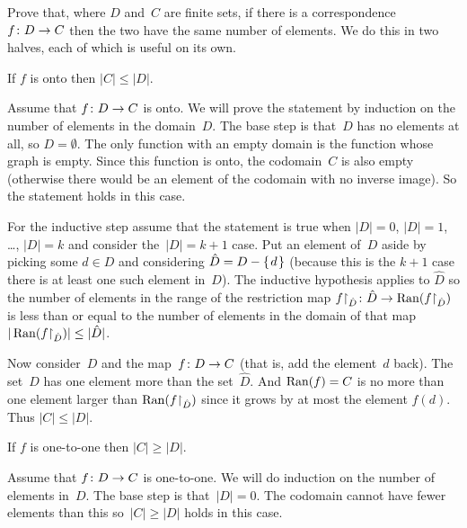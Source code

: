 \documentclass{ibl}  %
\begin{document}
\begin{problem}   \label{CorrespondingSetsHaveSameNumberOfElements}
  Prove that, 
  where $D$ and~$C$ are finite sets, 
  if there is a correspondence~$\mbox{$f\colon D\to C$}$
  then the two have the same number of elements.
  We do this in two halves, each of which is useful on its own.
\begin{exes}
\begin{exercise}
  If $f$ is onto then $|C|\leq |D|$.
\end{exercise}
\begin{answer}
  Assume that $\mbox{$f\colon D\to C$}$ is onto.
  We will prove the statement by induction on the number of elements in
  the domain~$D$.
  The base step is that~$D$ has no elements at all, so $D=\emptyset$.
  The only function with an empty domain is the function whose graph is 
  empty. 
  Since this function is onto, the codomain~$C$ is also empty 
  (otherwise there would be an element of the codomain with no inverse
  image).
  So the statement holds in this case.

  For the inductive step assume that the statement is true when $|D|=0$, 
  $|D|=1$, \ldots, $|D|=k$ and consider the~$|D|=k+1$ case.
  Put an element of~$D$ aside by picking some $d\in D$ and considering 
  $\hat{D}=D-\mbox{$\{\hspace{0.1em}d\hspace{0.1em}\}$}$ (because this is the $k+1$ case there is at least
  one such element in~$D$).
  The inductive hypothesis applies to $\hat{D}$ so the number of elements in
  the range of the restriction map 
  $\mbox{${f}\mathord\upharpoonright_{\hat{D}}\colon \hat{D}\to \operatorname{Ran}({f}\mathord\upharpoonright_{\hat{D}})$}$
  is less than or equal to the number of elements in the domain of that map
  $|\operatorname{Ran}({f}\mathord\upharpoonright_{\hat{D}})|\leq |\hat{D}|$.

  Now consider~$D$ and the 
  map~$\mbox{$f\colon D\to C$}$ (that is, add the element~$d$ back).
  The set~$D$ has one element more than the set~$\hat{D}$.
  And $\operatorname{Ran}(f)=C$ is no more than one element larger than
  $\operatorname{Ran}({f}\mathord\upharpoonright_{\hat{D}})$ since it grows by at most the
  element $f(d)$.
  Thus $|C|\leq|D|$.  
\end{answer}
\begin{exercise} 
  If $f$ is one-to-one then $|C|\geq |D|$.
\end{exercise}
\begin{answer}
  Assume that $\mbox{$f\colon D\to C$}$ is one-to-one.
  We will do induction on the number of elements in~$D$.
  The base step is that~$|D|=0$.
  The codomain cannot have fewer elements than this
  so~$|C|\geq |D|$ holds in this case.


\end{answer}
\end{exes}
\end{problem}
\end{document}
